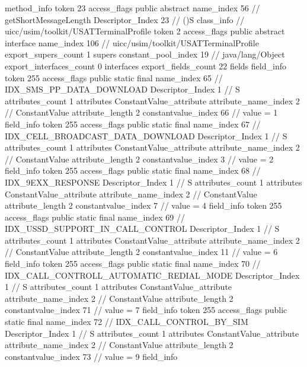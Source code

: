 {{{{{				}
				method_info {
					token	23
					access_flags	public abstract
					name_index	56		// getShortMessageLength
					Descriptor_Index	23		// ()S
				}
			}
		}
		class_info {		// uicc/usim/toolkit/USATTerminalProfile
			token	2
			access_flags	public abstract interface
			name_index	106		// uicc/usim/toolkit/USATTerminalProfile
			export_supers_count	1
			supers {
				constant_pool_index	19		// java/lang/Object
			}
			export_interfaces_count	0
			interfaces {
			}
			export_fields_count	22
			fields {
			field_info {
				token	255
				access_flags	public static final
				name_index	65		// IDX_SMS_PP_DATA_DOWNLOAD
				Descriptor_Index	1		// S
				attributes_count	1
				attributes {
				ConstantValue_attribute {
					attribute_name_index	2		// ConstantValue
					attribute_length	2
					constantvalue_index	66		// value = 1
				}
				}
			}
			field_info {
				token	255
				access_flags	public static final
				name_index	67		// IDX_CELL_BROADCAST_DATA_DOWNLOAD
				Descriptor_Index	1		// S
				attributes_count	1
				attributes {
				ConstantValue_attribute {
					attribute_name_index	2		// ConstantValue
					attribute_length	2
					constantvalue_index	3		// value = 2
				}
				}
			}
			field_info {
				token	255
				access_flags	public static final
				name_index	68		// IDX_9EXX_RESPONSE
				Descriptor_Index	1		// S
				attributes_count	1
				attributes {
				ConstantValue_attribute {
					attribute_name_index	2		// ConstantValue
					attribute_length	2
					constantvalue_index	7		// value = 4
				}
				}
			}
			field_info {
				token	255
				access_flags	public static final
				name_index	69		// IDX_USSD_SUPPORT_IN_CALL_CONTROL
				Descriptor_Index	1		// S
				attributes_count	1
				attributes {
				ConstantValue_attribute {
					attribute_name_index	2		// ConstantValue
					attribute_length	2
					constantvalue_index	11		// value = 6
				}
				}
			}
			field_info {
				token	255
				access_flags	public static final
				name_index	70		// IDX_CALL_CONTROLL_AUTOMATIC_REDIAL_MODE
				Descriptor_Index	1		// S
				attributes_count	1
				attributes {
				ConstantValue_attribute {
					attribute_name_index	2		// ConstantValue
					attribute_length	2
					constantvalue_index	71		// value = 7
				}
				}
			}
			field_info {
				token	255
				access_flags	public static final
				name_index	72		// IDX_CALL_CONTROL_BY_SIM
				Descriptor_Index	1		// S
				attributes_count	1
				attributes {
				ConstantValue_attribute {
					attribute_name_index	2		// ConstantValue
					attribute_length	2
					constantvalue_index	73		// value = 9
				}
				}
			}
			field_info {
}}}}}
